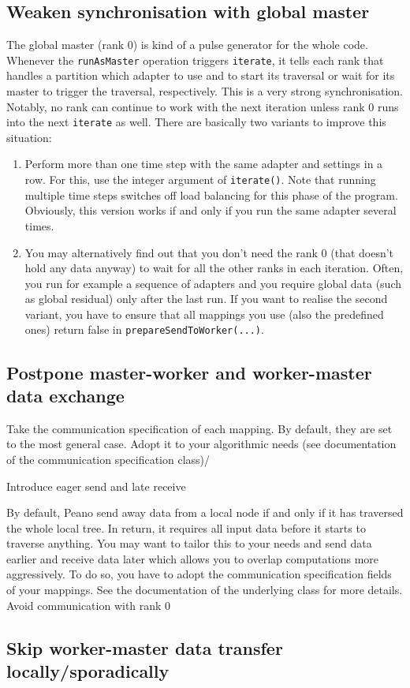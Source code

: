 \subsection{Weaken synchronisation with global master}

The global master (rank 0) is kind of a pulse generator for the whole code. 
Whenever the \texttt{runAsMaster} operation triggers \texttt{iterate}, it tells
each rank that handles a partition which adapter to use and to start its
traversal or wait for its master to trigger the traversal, respectively.
This is a very strong synchronisation.
Notably, no rank can continue to work with the next iteration unless rank 0 runs
into the next \texttt{iterate} as well.
There are basically two variants to improve this situation:

\begin{enumerate}
  \item Perform more than one time step with the same adapter and settings in a
  row. For this, use the integer argument of \texttt{iterate()}. Note that
  running multiple time steps switches off load balancing for this phase of the program.
  Obviously, this version works if and only if you run the same adapter several 
  times.
  \item You may alternatively find out that you don't need the rank 0 (that
  doesn't hold any data anyway) to wait for all the other ranks in each
  iteration. Often, you run for example a sequence of adapters and you require
  global data (such as global residual) only after the last run. 
  If you want to realise the second variant, you have to ensure that all
  mappings you use (also the predefined ones) return false in
  \texttt{prepareSendToWorker(...)}.
\end{enumerate}




\subsection{Postpone master-worker and worker-master data exchange}
    Take the communication specification of each mapping. By default, they are set to the most general case. Adopt it to your algorithmic needs (see documentation of the communication specification class)/


Introduce eager send and late receive

By default, Peano send away data from a local node if and only if it has traversed the whole local tree. In return, it requires all input data before it starts to traverse anything. You may want to tailor this to your needs and send data earlier and receive data later which allows you to overlap computations more aggressively. To do so, you have to adopt the communication specification fields of your mappings. See the documentation of the underlying class for more details.
Avoid communication with rank 0


\subsection{Skip worker-master data transfer locally/sporadically}
